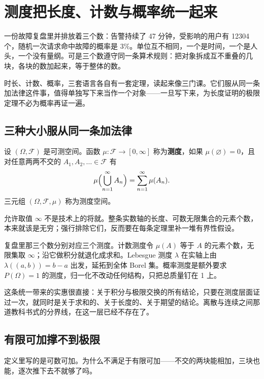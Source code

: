 \section{测度把长度、计数与概率统一起来}
\label{sec:12-Real-Analysis-Support/05-Measure-Integration-and-Conditional-Expectation/02}

一份故障复盘里并排放着三个数：告警持续了 47 分钟，受影响的用户有 12304 个，随机一次请求命中故障的概率是 \(3\%\)。单位互不相同，一个是时间，一个是人头，一个没有量纲。可是三个数遵守同一条算术规则：把对象拆成互不重叠的几块，各块的数加起来，等于整体的数。

时长、计数、概率，三套语言各自有一套定理，读起来像三门课。它们服从同一条加法律这件事，值得单独写下来当作一个对象——一旦写下来，为长度证明的极限定理不必为概率再证一遍。

\subsection{三种大小服从同一条加法律}

\begin{definition}
设 \((\Omega,\mathcal F)\) 是可测空间。函数 \(\mu:\mathcal F\to[0,\infty]\) 称为\textbf{测度}，如果 \(\mu(\varnothing)=0\)，且对任意两两不交的 \(A_1,A_2,\ldots\in\mathcal F\) 有
\[
\mu\Bigl(\bigcup_{n=1}^{\infty}A_n\Bigr)=\sum_{n=1}^{\infty}\mu(A_n).
\]
三元组 \((\Omega,\mathcal F,\mu)\) 称为测度空间。
\end{definition}

允许取值 \(\infty\) 不是技术上的将就。整条实数轴的长度、可数无限集合的元素个数，本来就该是无穷；强行排除它们，反而要在每条定理里补一堆有界性假设。

复盘里那三个数分别对应三个测度。计数测度令 \(\mu(A)\) 等于 \(A\) 的元素个数，无限集取 \(\infty\)；沿它做积分就退化成求和。Lebesgue 测度 \(\lambda\) 在实轴上由 \(\lambda((a,b))=b-a\) 出发，延拓到全体 Borel 集。概率测度是额外要求 \(P(\Omega)=1\) 的测度，归一化不改动任何结构，只把总质量钉在 1 上。

这条统一带来的实惠很直接：关于积分与极限交换的所有结论，只要在测度层面证过一次，就同时是关于求和的、关于长度的、关于期望的结论。离散与连续之间那道教科书式的分界线，在这一层已经不存在了。

\subsection{有限可加撑不到极限}

定义里写的是可数可加。为什么不满足于有限可加——不交的两块能相加，三块也能，逐次推下去不就够了吗。

